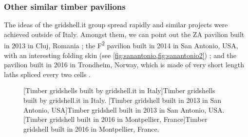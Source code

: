 \subsubsection{Other similar timber pavilions}
The ideas of the gridshell.it group spread rapidly and similar projects were achieved outside of Italy. Amongst them, we can point out the ZA pavilion built in 2013 in Cluj, Romania \cite{Naicu2014} ; the F\textsuperscript{2} pavilion built in 2014 in San Antonio, USA, with an interesting folding skin (see \cref{fig:sanantonio,fig:sanantonio2}) ; and the pavilion built in 2016 in Trondheim, Norway, which is made of very short length laths spliced every two cells \cite{Mork2016,Labonnote2016}.

\begin{figure}[p]
     	\centering
		\hspace*{\fill}
		\vspace{10pt}
		[Timber gridshells built by gridshell.it in Italy]{Timber gridshells built by gridshell.it in Italy.}
		\label{fig:gsii}    
		\vspace{0.5cm}
		\hspace*{\fill}
		\vspace{10pt}
		[Timber gridshell built in 2013 in San Antonio, USA]{Timber gridshell built in 2013 in San Antonio, USA.}
		\label{fig:otherpav} 
		\vspace{0.5cm}
		\hspace*{\fill}
		\vspace{10pt}
		[Timber gridshell built in 2016 in Montpellier, France]{Timber gridshell built in 2016 in Montpellier, France.}
		\label{fig:jpofav}    
\end{figure}

